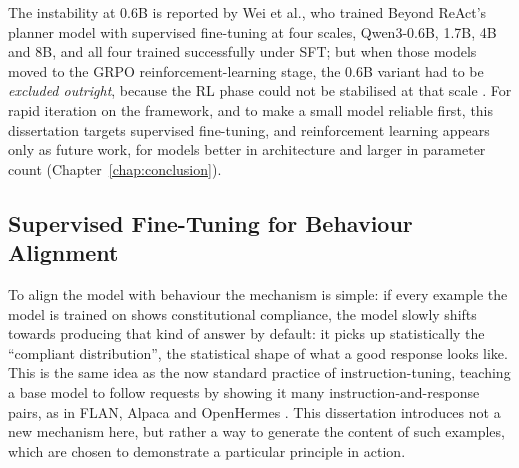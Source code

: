 The instability at 0.6B is reported by Wei et al., who trained Beyond ReAct's planner model with supervised fine-tuning at four scales, Qwen3-0.6B, 1.7B, 4B and 8B, and all four trained successfully under SFT; but when those models moved to the GRPO reinforcement-learning stage, the 0.6B variant had to be \emph{excluded outright}, because the RL phase could not be stabilised at that scale \cite{wei2025reactplannercentricframeworkcomplex}. For rapid iteration on the framework, and to make a small model reliable first, this dissertation targets supervised fine-tuning, and reinforcement learning appears only as future work, for models better in architecture and larger in parameter count (Chapter~\ref{chap:conclusion}).

\subsection{Supervised Fine-Tuning for Behaviour Alignment}
\label{subsec:supervised-fine-tuning-for-behaviour-alignment}

To align the model with behaviour the mechanism is simple: if every example the model is trained on shows constitutional compliance, the model slowly shifts towards producing that kind of answer by default: it picks up statistically the ``compliant distribution'', the statistical shape of what a good response looks like. This is the same idea as the now standard practice of instruction-tuning, teaching a base model to follow requests by showing it many instruction-and-response pairs, as in FLAN, Alpaca and OpenHermes \cite{wei2022finetunedlanguagemodelszeroshot, taori2023alpaca, teknium2024openhermes}. This dissertation introduces not a new mechanism here, but rather a way to generate the content of such examples, which are chosen to demonstrate a particular principle in action.

